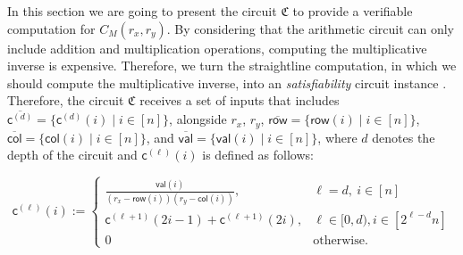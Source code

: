 In this section we are going to present the circuit $\mathfrak{C}$ to provide a verifiable computation for $C_M(r_x, r_y)$.  By considering that the arithmetic circuit can only include addition and multiplication operations, computing the multiplicative inverse is expensive. Therefore, we turn the straightline computation, in which we should compute the multiplicative inverse, into an \textit{satisfiability} circuit instance \cite{Thaler2022}. Therefore, the circuit $\mathfrak{C}$ receives a set of inputs that includes $\overline{\mathsf{c}^{(d)}} = \{\mathsf{c}^{(d)}(i) \mid i \in [n]\}$, alongside $r_x$, $r_y$, $\overline{\mathsf{row}} = \{\mathsf{row}(i) \mid i \in [n]\}$, $\overline{\mathsf{col}} = \{\mathsf{col}(i) \mid i \in [n]\}$, and $\overline{\mathsf{val}} = \{\mathsf{val}(i) \mid i \in [n]\}$, where $d$ denotes the depth of the circuit and $\mathsf{c}^{(\ell)}(i)$ is defined as follows:

\begin{equation}
	\mathsf{c}^{(\ell)}(i) := 
	\begin{cases}
		\frac{\mathsf{val}(i)}{\left(r_x - \mathsf{row}(i)\right)\left(r_y - \mathsf{col}(i)\right)}, & \ell = d,  \  i \in [n]\\%
		\mathsf{c}^{(\ell + 1)}(2i-1) + \mathsf{c}^{(\ell + 1)}(2i), & \ell \in [ 0,  d), i \in  [2^{\ell-d}n]  \\
		0 & \text{otherwise}.
	\end{cases}
	\label{eq:c_i}
\end{equation}

